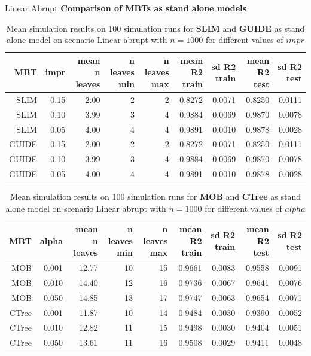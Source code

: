 \documentclass[9pt, xcolor=table]{beamer}
\begin{document}
\begin{frame}{Linear Abrupt}
\textbf{Comparison of MBTs as stand alone models}
\begin{table}

\caption{Mean simulation results on 100 simulation runs for \textbf{SLIM} and \textbf{GUIDE}  as stand alone model on scenario Linear abrupt with $n = 1000$ for different values of $impr$}
\centering \tiny
\begin{tabular}[t]{r|r|r|r|r|r|r|r|r}
\hline
MBT & impr & mean n leaves & n leaves min & n leaves max & mean R2 train & sd R2 train & mean R2 test & sd R2 test\\
\hline
SLIM & 0.15 & 2.00 & 2 & 2 & 0.8272 & 0.0071 & 0.8250 & 0.0111\\
\hline
SLIM & 0.10 & 3.99 & 3 & 4 & 0.9884 & 0.0069 & 0.9870 & 0.0078\\
\hline
SLIM & 0.05 & 4.00 & 4 & 4 & 0.9891 & 0.0010 & 0.9878 & 0.0028\\
\hline
GUIDE & 0.15 & 2.00 & 2 & 2 & 0.8272 & 0.0071 & 0.8250 & 0.0111\\
\hline
GUIDE & 0.10 & 3.99 & 3 & 4 & 0.9884 & 0.0069 & 0.9870 & 0.0078\\
\hline
GUIDE & 0.05 & 4.00 & 4 & 4 & 0.9891 & 0.0010 & 0.9878 & 0.0028\\
\hline
\end{tabular}
\end{table}

\begin{table}
\caption{Mean simulation results on 100 simulation runs for \textbf{MOB} and \textbf{CTree}  as stand alone model on scenario Linear abrupt with $n = 1000$ for different values of $alpha$}
\centering \tiny
\begin{tabular}[t]{r|r|r|r|r|r|r|r|r}
\hline
MBT & alpha & mean n leaves & n leaves min & n leaves max & mean R2 train & sd R2 train & mean R2 test & sd R2 test\\
\hline
MOB & 0.001 & 12.77 & 10 & 15 & 0.9661 & 0.0083 & 0.9558 & 0.0091\\
\hline
MOB & 0.010 & 14.40 & 12 & 16 & 0.9736 & 0.0067 & 0.9641 & 0.0076\\
\hline
MOB & 0.050 & 14.85 & 13 & 17 & 0.9747 & 0.0063 & 0.9654 & 0.0071\\
\hline
CTree & 0.001 & 11.87 & 10 & 14 & 0.9484 & 0.0030 & 0.9390 & 0.0052\\
\hline
CTree & 0.010 & 12.82 & 11 & 15 & 0.9498 & 0.0030 & 0.9404 & 0.0051\\
\hline
CTree & 0.050 & 13.61 & 11 & 16 & 0.9508 & 0.0029 & 0.9411 & 0.0048\\
\hline
\end{tabular}
\end{table}

\end{frame}
\end{document}
